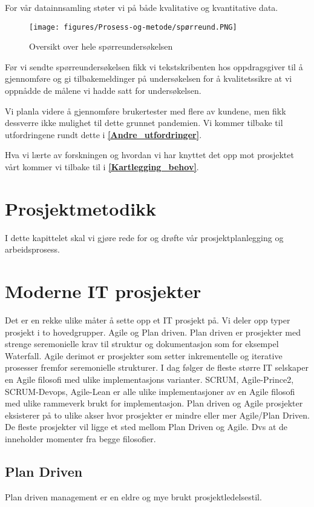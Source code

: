 For vår datainnsamling støter vi på både kvalitative og kvantitative data.

\begin{figure}[H] 
    \centering
    \texttt{[image: figures/Prosess-og-metode/spørreund.PNG]}
    \caption{Oversikt over hele spørreundersøkelsen}
\end{figure}

Før vi sendte spørreundersøkelsen fikk vi tekstskribenten hos oppdragsgiver til å gjennomføre og gi tilbakemeldinger på undersøkelsen for å kvalitetssikre at vi oppnådde de målene vi hadde satt for undersøkelsen.

Vi planla videre å gjennomføre brukertester med flere av kundene, men fikk dessverre ikke mulighet til dette grunnet pandemien. Vi kommer tilbake til utfordringene rundt dette i \textbf{\ref{Andre_utfordringer}}.

Hva vi lærte av forskningen og hvordan vi har knyttet det opp mot prosjektet vårt kommer vi tilbake til i \textbf{\ref{Kartlegging_behov}}.

\section{\textbf{Prosjektmetodikk}}
I dette kapittelet skal vi gjøre rede for og drøfte vår prosjektplanlegging og arbeidsprosess.

\section{\textbf{Moderne IT prosjekter}}
Det er en rekke ulike måter å sette opp et IT prosjekt på. Vi deler opp typer prosjekt i to hovedgrupper. Agile og Plan driven. Plan driven er prosjekter med strenge seremonielle krav til struktur og dokumentasjon som for eksempel Waterfall. Agile derimot er prosjekter som setter inkrementelle og iterative prosesser fremfor seremonielle strukturer. I dag følger de fleste større IT selskaper en Agile filosofi med ulike implementasjons varianter. SCRUM, Agile-Prince2, SCRUM-Devops, Agile-Lean er alle ulike implementasjoner av en Agile filosofi med ulike rammeverk brukt for implementasjon. Plan driven og Agile prosjekter eksisterer på to ulike akser hvor prosjekter er mindre eller mer Agile/Plan Driven. De fleste prosjekter vil ligge et sted mellom Plan Driven og Agile. Dvs at de inneholder momenter fra begge filosofier. 


\subsection{\textbf{Plan Driven}}
Plan driven management er en eldre og mye brukt prosjektledelsestil. 

